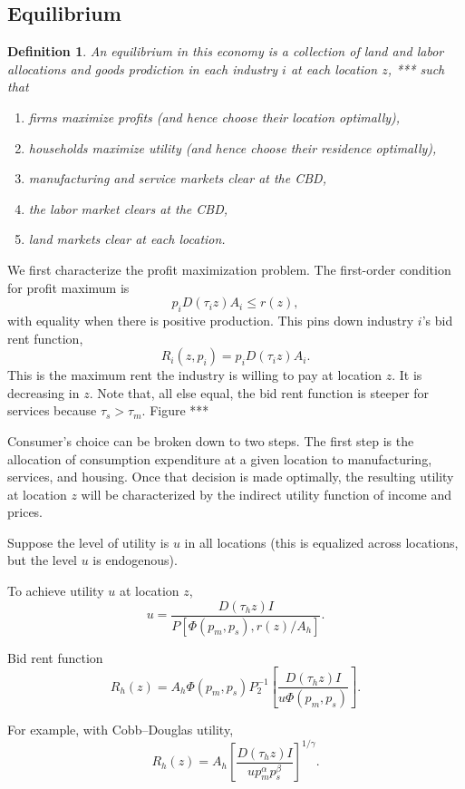 \documentclass[12pt]{article}
\newtheorem{definition}{Definition}
\begin{document}
\subsection{Equilibrium}
\begin{definition}
 An \emph{equilibrium} in this economy is a collection of land and labor allocations and goods prodiction in each industry $i$ at each location $z$, *** such that
\begin{enumerate}
 \item firms maximize profits (and hence choose their location optimally),
 \item households maximize utility (and hence choose their residence optimally),
 \item manufacturing and service markets clear at the CBD,
 \item the labor market clears at the CBD,
 \item land markets clear at each location.
\end{enumerate}

\end{definition}

We first characterize the profit maximization problem. The first-order condition for profit maximum is
\[
p_i D(\tau_i z)A_i \le r(z),
\]
with equality when there is positive production. This pins down industry $i$'s bid rent function,
\[
R_i(z,p_i) = p_i D(\tau_i z)A_i.
\]
This is the maximum rent the industry is willing to pay at location $z$. It is decreasing in $z$. Note that, all else equal, the bid rent function is steeper for services because $\tau_s>\tau_m$. Figure ***





Consumer's choice can be broken down to two steps. The first step is the allocation of consumption expenditure at a given location to manufacturing, services, and housing. Once that decision is made optimally, the resulting utility at location $z$ will be characterized by the indirect utility function of income and prices.

Suppose the level of utility is $u$ in all locations (this is equalized across locations, but the level $u$ is endogenous).

To achieve utility $u$ at location $z$,
    \[
    u = \frac{D(\tau_h z) I}{P[\Phi(p_m,p_s),r(z)/A_h]}.
    \]
    \item Bid rent function
    \[
    R_h(z) = A_h\Phi(p_m,p_s)P_2^{-1}\left[\frac{D(\tau_h z) I}{u\Phi(p_m,p_s)}\right].
    \]
	\item For example, with Cobb--Douglas utility,
\[
R_h(z) = A_h\left[\frac{D(\tau_h z) I}{up_m^{\alpha}p_s^{\beta}}\right]^{1/\gamma}.
\]
\end{document}
